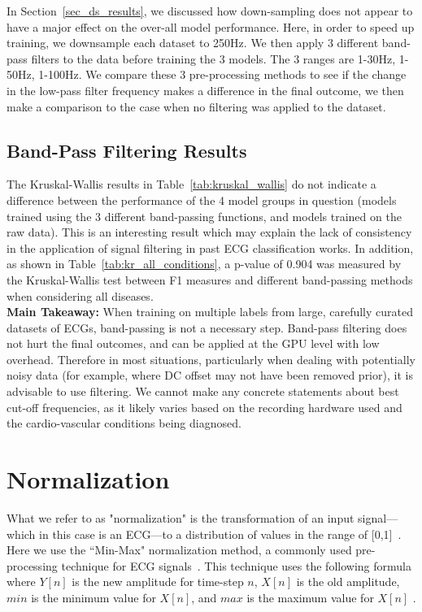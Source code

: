 \documentclass[pmlr,twocolumn]{jmlr}%
\begin{document}
In Section~\ref{sec_ds_results}, we discussed how down-sampling does not appear to have a major effect on the over-all model performance. Here, in order to speed up training, we downsample each dataset to 250Hz. We then apply 3 different band-pass filters to the data before training the 3 models. The 3 ranges are 1-30Hz, 1-50Hz, 1-100Hz. We compare these 3 pre-processing methods to see if the change in the low-pass filter frequency makes a difference in the final outcome, we then make a comparison to the case when no filtering was applied to the dataset. 

\subsection{Band-Pass Filtering Results}
The Kruskal-Wallis results in Table~\ref{tab:kruskal_wallis} do not indicate a difference between the performance of the 4 model groups in question (models trained using the 3 different band-passing functions, and models trained on the raw data). This is an interesting result which may explain the lack of consistency in the application of signal filtering in past ECG classification works. In addition, as shown in Table~\ref{tab:kr_all_conditions}, a p-value of 0.904 was measured by the Kruskal-Wallis test between F1 measures and different band-passing methods when considering all diseases. 
\\
\textbf{Main Takeaway:} When training on multiple labels from large, carefully curated datasets of ECGs, band-passing is not a necessary step. Band-pass filtering does not hurt the final outcomes, and can be applied at the GPU level with low overhead. Therefore in most situations, particularly when dealing with potentially noisy data (for example, where DC offset may not have been removed prior), it is advisable to use filtering. We cannot make any concrete statements about best cut-off frequencies, as it likely varies based on the recording hardware used and the cardio-vascular conditions being diagnosed. 

\section{Normalization}
\label{sec:Norm}
What we refer to as "normalization" is the transformation of an input signal---which in this case is an ECG---to a distribution of values in the range of [0,1]~\citep{hong2022practical}. Here we use the ``Min-Max" normalization method, a commonly used pre-processing technique for ECG signals~\citep{uwaechia2021comprehensive,li2010robust,li2019identifying,fang2009human}. This technique uses the following formula where $Y[n]$ is the new amplitude for time-step $n$, $X[n]$ is the old amplitude, $min$ is the minimum value for $X[n]$, and $max$ is the maximum value for $X[n]$ \citep{uwaechia2021comprehensive}.
\end{document}
